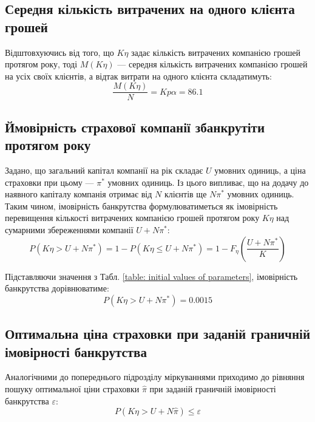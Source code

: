 \documentclass{mathreport}
\begin{document}
\subsection{Середня кількість витрачених на одного клієнта грошей}

Відштовхуючись від того, що $K\eta$ задає кількість витрачених компанією грошей протягом року, тоді $M(K\eta)$ --- середня кількість витрачених компанією грошей на усіх своїх клієнтів, а відтак витрати на одного клієнта складатимуть:
\begin{equation}\label{eq: expenses per client}
    \frac{M(K\eta)}{N} = Kp\alpha = 86.1 
\end{equation}

\subsection{Ймовірність страхової компанії збанкрутіти протягом року}

Задано, що загальний капітал компанії на рік складає $U$ умовних одиниць, а ціна страховки при цьому --- $\pi^*$ умовних одиниць. Із цього випливає, що на додачу до наявного капіталу компанія отримає від $N$ клієнтів ще $N\pi^*$ умовних одиниць. Таким чином, імовірність банкрутства формулюватиметься як імовірність перевищення кількості витрачених компанією грошей протягом року $K\eta$ над сумарними збереженнями компанії $U+N\pi^*:$
\begin{equation}\label{eq: bankruptcy probability}
    P\left( K\eta > U+N\pi^* \right) = 1 - P\left( K\eta \leqslant U+N\pi^* \right) = 1 - F_{\eta}\left( \frac{U+N\pi^*}{K} \right)
\end{equation}

Підставляючи значення з Табл. \ref{table: initial values of parameters}, імовірність банкрутства дорівнюватиме:
\begin{equation}\label{eq: bankruptcy probability value}
    P\left( K\eta > U+N\pi^* \right) = 0.0015
\end{equation}

\subsection{Оптимальна ціна страховки при заданій граничній імовірності банкрутства}

Аналогічними до попереднього підрозділу міркуваннями приходимо до рівняння пошуку оптимальної ціни страховки $\widehat{\pi}$ при заданій граничній імовірності банкрутства $\varepsilon:$
\begin{equation}\label{eq: optimal policy price part 1}
    P\left( K\eta > U+N\widehat{\pi} \right) \leqslant \varepsilon
\end{equation}
\end{document}
